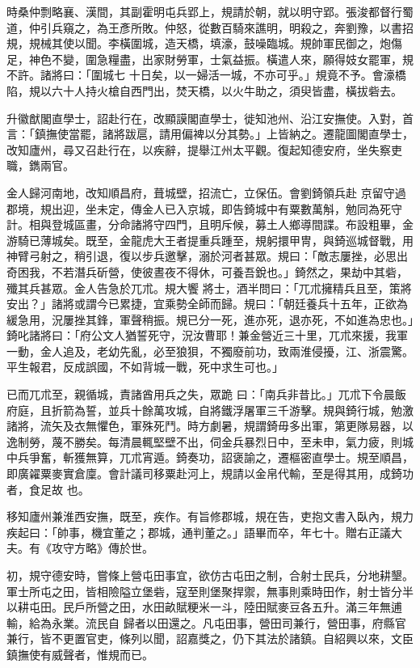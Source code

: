 \begin{pinyinscope}
 時桑仲剽略襄、漢間，其副霍明屯兵郢上，規請於朝，就以明守郢。張浚都督行蜀道，仲引兵窺之，為王彥所敗。仲怒，從數百騎來譙明，明殺之，奔劉豫，以書招規，規械其使以聞。李橫圍城，造天橋，填濠，鼓噪臨城。規帥軍民御之，炮傷足，神色不變，圍急糧盡，出家財勞軍，士氣益振。橫遣人來，願得妓女罷軍，規不許。諸將曰：「圍城七
 十日矣，以一婦活一城，不亦可乎。」規竟不予。會濠橋陷，規以六十人持火槍自西門出，焚天橋，以火牛助之，須臾皆盡，橫拔砦去。



 升徽猷閣直學士，詔赴行在，改顯謨閣直學士，徙知池州、沿江安撫使。入對，首言：「鎮撫使當罷，諸將跋扈，請用偏裨以分其勢。」上皆納之。遷龍圖閣直學士，改知廬州，尋又召赴行在，以疾辭，提舉江州太平觀。復起知德安府，坐失察吏職，鐫兩官。



 金人歸河南地，改知順昌府，葺城壁，招流亡，立保伍。會劉錡領兵赴
 京留守過郡境，規出迎，坐未定，傳金人已入京城，即告錡城中有粟數萬斛，勉同為死守計。相與登城區畫，分命諸將守四門，且明斥候，募土人鄉導間諜。布設粗畢，金游騎已薄城矣。既至，金龍虎大王者提重兵踵至，規躬擐甲冑，與錡巡城督戰，用神臂弓射之，稍引退，復以步兵邀擊，溺於河者甚眾。規曰：「敵志屢挫，必思出奇困我，不若潛兵斫營，使彼晝夜不得休，可養吾銳也。」錡然之，果劫中其砦，殲其兵甚眾。金人告急於兀朮。規大饗
 將士，酒半問曰：「兀朮擁精兵且至，策將安出？」諸將或謂今已累捷，宜乘勢全師而歸。規曰：「朝廷養兵十五年，正欲為緩急用，況屢挫其鋒，軍聲稍振。規已分一死，進亦死，退亦死，不如進為忠也。」錡叱諸將曰：「府公文人猶誓死守，況汝曹耶！兼金營近三十里，兀朮來援，我軍一動，金人追及，老幼先亂，必至狼狽，不獨廢前功，致兩淮侵擾，江、浙震驚。平生報君，反成誤國，不如背城一戰，死中求生可也。」



 已而兀朮至，親循城，責諸酋用兵之失，眾跪
 曰：「南兵非昔比。」兀朮下令晨飯府庭，且折箭為誓，並兵十餘萬攻城，自將鐵浮屠軍三千游擊。規與錡行城，勉激諸將，流矢及衣無懼色，軍殊死鬥。時方劇暑，規謂錡毋多出軍，第更隊易器，以逸制勞，蔑不勝矣。每清晨輒堅壁不出，伺金兵暴烈日中，至未申，氣力疲，則城中兵爭奮，斬獲無算，兀朮宵遁。錡奏功，詔褒諭之，遷樞密直學士。規至順昌，即廣糴粟麥實倉廩。會計議司移粟赴河上，規請以金帛代輸，至是得其用，成錡功者，食足故
 也。



 移知廬州兼淮西安撫，既至，疾作。有旨修郡城，規在告，吏抱文書入臥內，規力疾起曰：「帥事，機宜董之；郡城，通判董之。」語畢而卒，年七十。贈右正議大夫。有《攻守方略》傳於世。



 初，規守德安時，嘗條上營屯田事宜，欲仿古屯田之制，合射士民兵，分地耕墾。軍士所屯之田，皆相險隘立堡砦，寇至則堡聚捍禦，無事則乘時田作，射士皆分半以耕屯田。民戶所營之田，水田畝賦粳米一斗，陸田賦麥豆各五升。滿三年無逋輸，給為永業。流民自
 歸者以田還之。凡屯田事，營田司兼行，營田事，府縣官兼行，皆不更置官吏，條列以聞，詔嘉獎之，仍下其法於諸鎮。自紹興以來，文臣鎮撫使有威聲者，惟規而已。




\end{pinyinscope}

